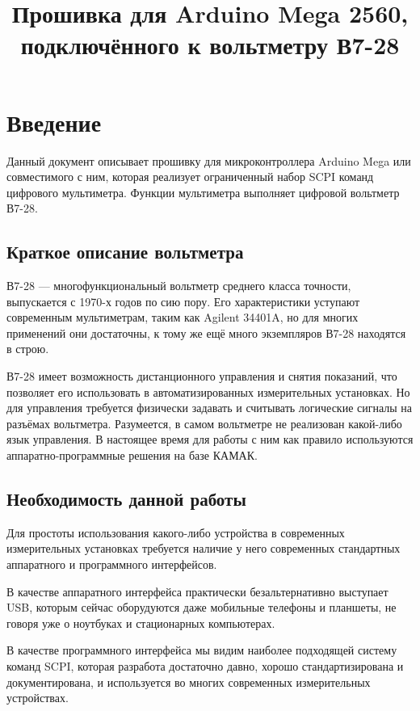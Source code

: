 \documentclass[10pt, a4paper, twocolumn]{article}
\title{Прошивка для Arduino Mega 2560, подключённого к вольтметру В7-28}
\newcommand{\SCPI}{\mbox{SCPI}}
\newcommand{\V}{\mbox{В7-28}}
\newcommand{\Arduino}{Arduino Mega}
\begin{document}
\maketitle

\section{Введение}

Данный документ описывает прошивку для микроконтроллера \Arduino{} или совместимого с ним, которая реализует ограниченный набор \SCPI{} команд цифрового мультиметра. Функции мультиметра выполняет цифровой вольтметр \V.

\subsection{Краткое описание вольтметра}

\V{} --- многофункциональный вольтметр среднего класса точности, выпускается с 1970-х годов по сию пору. Его характеристики уступают современным мультиметрам, таким как Agilent \mbox{34401A}, но для многих применений они достаточны, к тому же ещё много экземпляров \V{} находятся в строю.

\V{} имеет возможность дистанционного управления и снятия показаний, что позволяет его использовать в автоматизированных измерительных установках. Но для управления требуется физически задавать и считывать логические сигналы на разъёмах вольтметра. Разумеется, в самом вольтметре не реализован какой-либо язык управления. В настоящее время для работы с ним как правило используются аппаратно-программные решения на базе КАМАК.

\subsection{Необходимость данной работы}

Для простоты использования какого-либо устройства в современных измерительных установках требуется наличие у него современных стандартных аппаратного и программного интерфейсов.

В качестве аппаратного интерфейса практически безальтернативно выступает USB, которым сейчас оборудуются даже мобильные телефоны и планшеты, не говоря уже о ноутбуках и стационарных компьютерах.

В качестве программного интерфейса мы видим наиболее подходящей систему команд \SCPI, которая разработа достаточно давно, хорошо стандартизирована и документирована, и используется во многих современных измерительных устройствах.
\end{document}
